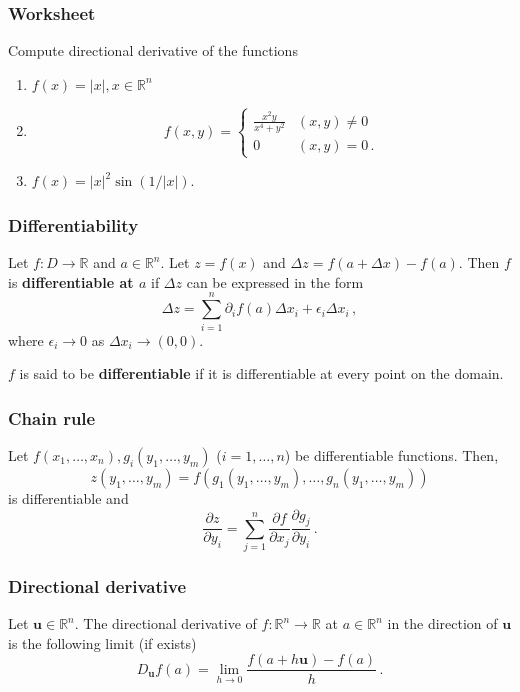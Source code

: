 \documentclass[aspectratio=169,handout]{beamer}
\begin{document}
\begin{frame}
    \frametitle{Worksheet}
    Compute directional derivative of the functions
    \begin{enumerate}
        \item $f(x) = |x|, x\in \mathbb{R}^n$
        \item $$ f(x,y) = 
            \begin{cases}
                \frac{x^2y}{x^4 + y^2} & (x,y) \not= 0 \\
                0 & (x,y) = 0 \,.
            \end{cases}$$
        \item $ f(x) = |x|^2 \sin(1/|x|)$.
    \end{enumerate}
\end{frame}


\begin{frame}
    \frametitle{Differentiability}
\begin{definition}
Let \(f:D \to \mathbb{R}\) and \(a\in \mathbb{R}^n\).
Let \(z = f(x)\) and \(\Delta z = f(a + \Delta x ) - f(a)\).
Then \(f\) is \textbf{differentiable at \(a\)} if \(\Delta z\) can be
expressed in the form
\begin{equation*}
    \Delta z = \sum_{i=1}^n \partial_i f(a) \Delta x_i +  \epsilon_i \Delta x_i  \,,
\end{equation*}
where \(\epsilon_i \to 0\) as \(\Delta x_i \to (0,0)\).

\(f\) is said to be \textbf{differentiable} if it is differentiable at every point on the domain.
\end{definition}
\end{frame}


\begin{frame}
    \frametitle{Chain rule}
\begin{theorem}
Let \(f(x_1,\dots, x_n), g_i(y_1,\dots, y_m)\) (\(i = 1,\dots, n\)) be
differentiable
functions.
Then,
\[z(y_1, \dots, y_m) = f(g_1(y_1, \dots, y_m), \dots, g_n(y_1, \dots, y_m))\]
is differentiable and
\begin{equation*}
    \frac{\partial z}{\partial y_i} = \sum_{j=1}^n \frac{\partial f}{\partial x_j} \frac{\partial g_j}{\partial y_i} \,.
\end{equation*}
\end{theorem}
\end{frame}


\begin{frame}
    \frametitle{ Directional derivative  }
\begin{definition}
Let \(\mathbf{u} \in \mathbb{R}^n\). The directional derivative of \(f:\mathbb{R}^n \to \mathbb{R}\) at \(a\in \mathbb{R}^n\)
in the direction of \(\mathbf{u}\) is the following limit (if exists)
\begin{equation*}
    D_{\mathbf{u}} f(a) = \lim_{h \to 0} \frac{ f( a + h \mathbf{u}) - f(a)}{h}\,.
\end{equation*}
\end{definition}
\end{frame}
\end{document}
